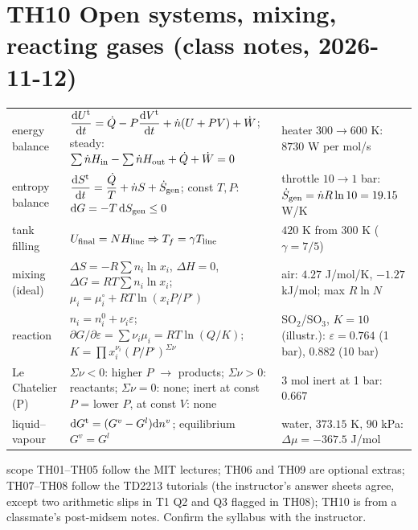 \documentclass[9pt]{article}
\begin{document}
\section*{TH10 Open systems, mixing, reacting gases (class notes, 2026-11-12)}
\begin{tabular}{@{}p{2.9cm}p{8.4cm}p{6.1cm}@{}}
\toprule
energy balance & $\dfrac{\mathrm dU^{\rm t}}{\mathrm dt}=\dot Q-P\dfrac{\mathrm dV^{\rm t}}{\mathrm dt}+\dot n(U+PV)+\dot W$; steady: $\sum\dot nH_{\rm in}-\sum\dot nH_{\rm out}+\dot Q+\dot W=0$ & heater $300\to600$ K: $8730$ W per mol/s\\
entropy balance & $\dfrac{\mathrm dS^{\rm t}}{\mathrm dt}=\dfrac{\dot Q}T+\dot nS+\dot S_{\rm gen}$; const $T,P$: $\mathrm dG=-T\,\mathrm dS_{\rm gen}\le0$ & throttle $10\to1$ bar: $\dot S_{\rm gen}=\dot nR\ln10=19.15$ W/K\\
tank filling & $U_{\rm final}=NH_{\rm line}\Rightarrow T_f=\gamma T_{\rm line}$ & $420$ K from $300$ K ($\gamma=7/5$)\\
mixing (ideal) & $\Delta S=-R\sum n_i\ln x_i$, $\Delta H=0$, $\Delta G=RT\sum n_i\ln x_i$; $\mu_i=\mu_i^\circ+RT\ln(x_iP/P^\circ)$ & air: $4.27$ J/mol/K, $-1.27$ kJ/mol; max $R\ln N$\\
reaction & $n_i=n_i^0+\nu_i\varepsilon$; $\partial G/\partial\varepsilon=\sum\nu_i\mu_i=RT\ln(Q/K)$; $K=\prod x_i^{\nu_i}(P/P^\circ)^{\Sigma\nu}$ & SO$_2$/SO$_3$, $K=10$ (illustr.): $\varepsilon=0.764$ (1 bar), $0.882$ (10 bar)\\
Le Chatelier (P) & $\Sigma\nu<0$: higher $P$ $\to$ products; $\Sigma\nu>0$: reactants; $\Sigma\nu=0$: none; inert at const $P$ = lower $P$, at const $V$: none & $3$ mol inert at 1 bar: $0.667$\\
liquid--vapour & $\mathrm dG^{\rm t}=(G^v-G^l)\mathrm dn^v$; equilibrium $G^v=G^l$ & water, $373.15$ K, $90$ kPa: $\Delta\mu=-367.5$ J/mol\\
\bottomrule
\end{tabular}

\vspace{3pt}
\begin{verifybox}{scope}
TH01--TH05 follow the MIT lectures; TH06 and TH09 are optional extras; TH07--TH08 follow the TD2213 tutorials (the instructor's answer sheets agree, except two arithmetic slips in T1 Q2 and Q3 flagged in TH08); TH10 is from a classmate's post-midsem notes. Confirm the syllabus with the instructor.
\end{verifybox}
\end{document}
